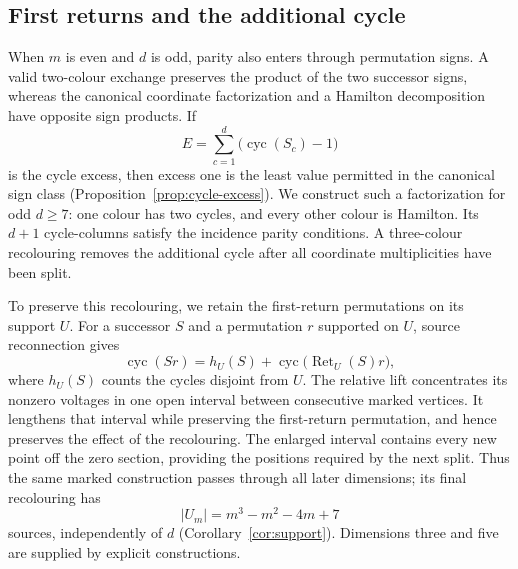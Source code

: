 \documentclass[11pt,reqno]{amsart}
\numberwithin{equation}{section}
\theoremstyle{definition}
\theoremstyle{remark}
\newcommand{\cyc}{\operatorname{cyc}}
\newcommand{\Ret}{\operatorname{Ret}}
\begin{document}
\subsection{First returns and the additional cycle}
When $m$ is even and $d$ is odd, parity also enters through permutation
signs. A valid two-colour exchange preserves the product of the two
successor signs, whereas the canonical coordinate factorization and a
Hamilton decomposition have opposite sign products. If
\[
 E=\sum_{c=1}^d\bigl(\cyc(S_c)-1\bigr)
\]
is the cycle excess, then excess one is the least value permitted in
the canonical sign class (Proposition~\ref{prop:cycle-excess}).
We construct such a factorization for odd $d\ge7$: one colour has two
cycles, and every other colour is Hamilton. Its $d+1$ cycle-columns
satisfy the incidence parity conditions. A three-colour recolouring
removes the additional cycle after all coordinate multiplicities have
been split.

To preserve this recolouring, we retain the first-return permutations
on its support $U$. For a successor $S$ and a permutation $r$ supported
on $U$, source reconnection gives
\[
 \cyc(Sr)=h_U(S)+\cyc\bigl(\Ret_U(S)r\bigr),
\]
where $h_U(S)$ counts the cycles disjoint from $U$. The relative lift
concentrates its nonzero voltages in one open interval between
consecutive marked vertices. It lengthens that interval while preserving
the first-return permutation, and hence preserves the effect of the
recolouring. The enlarged interval contains every new point off the
zero section, providing the positions required by the next split.
Thus the same marked construction passes through all later dimensions;
its final recolouring has
\[
 |U_m|=m^3-m^2-4m+7
\]
sources, independently of $d$ (Corollary~\ref{cor:support}).
Dimensions three and five are supplied by explicit constructions.
\end{document}

